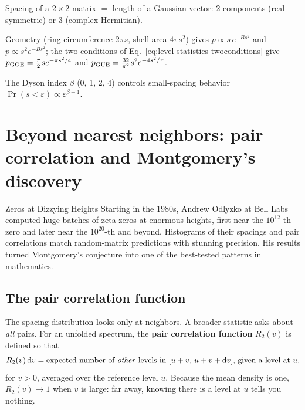 \begin{keyideas}
\item Spacing of a $2\times2$ matrix $=$ length of a Gaussian vector: 2 components (real symmetric) or 3 (complex Hermitian).
\item Geometry (ring circumference $2\pi s$, shell area $4\pi s^2$) gives $p\propto s\,e^{-Bs^2}$ and $p\propto s^2e^{-Bs^2}$; the two conditions of Eq.~\eqref{eq:level-statistics-twoconditions} give $p_{\rm GOE}=\frac\pi2se^{-\pi s^2/4}$ and $p_{\rm GUE}=\frac{32}{\pi^2}s^2e^{-4s^2/\pi}$.
\item The Dyson index $\beta$ (0, 1, 2, 4) controls small-spacing behavior $\Pr(s<\varepsilon)\propto\varepsilon^{\beta+1}$.
\end{keyideas}

\section{Beyond nearest neighbors: pair correlation and Montgomery's discovery}\label{sec:level-statistics-pair}
\begin{didyouknow}{Zeros at Dizzying Heights}
Starting in the 1980s, Andrew Odlyzko at Bell Labs computed huge batches of zeta zeros at enormous heights, first near the $10^{12}$-th zero and later near the $10^{20}$-th and beyond. Histograms of their spacings and pair correlations match random-matrix predictions with stunning precision. His results turned Montgomery's conjecture into one of the best-tested patterns in mathematics.
\end{didyouknow}

\subsection{The pair correlation function}

The spacing distribution looks only at neighbors. A broader statistic asks about \emph{all} pairs. For an unfolded spectrum, the \textbf{pair correlation function} $R_2(v)$ is defined so that
\begin{equation}
R_2(v)\,\mathrm{d} v=\text{expected number of \emph{other} levels in }[u+v,\,u+v+\mathrm{d} v]\text{, given a level at }u,
\label{eq:level-statistics-R2def}
\end{equation}
for $v>0$, averaged over the reference level $u$. Because the mean density is one, $R_2(v)\to1$ when $v$ is large: far away, knowing there is a level at $u$ tells you nothing.


